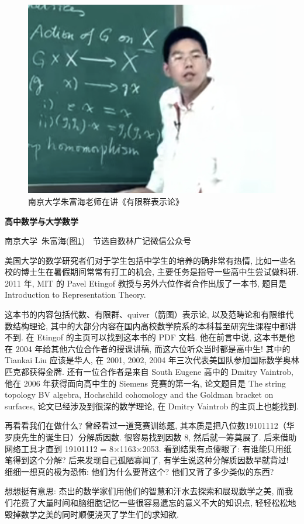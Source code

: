 	\begin{figure}
		\centering
		\includegraphics[scale=0.2]{2-prop-logic/figs/fhzhu}
		\caption{南京大学朱富海老师在讲《有限群表示论》}
		\label{fig:fhzhu}
	\end{figure}
\newpage
\begin{pas}
	\begin{center}
		\large \textbf{高中数学与大学数学}
	\end{center}
	\begin{center}
		南京大学~朱富海(图\ref{fig:fhzhu})~~节选自数林广记微信公众号
	\end{center}

	美国大学的数学研究者们对于学生包括中学生的培养的确非常有热情, 比如一些名校的博士生在暑假期间常常有打工的机会, 主要任务是指导一些高中生尝试做科研. 2011 年, MIT 的 Pavel Etingof 教授与另外六位作者合作出版了一本书, 题目是 Introduction to Representation Theory.
	

	
	这本书的内容包括代数、有限群、quiver（箭图）表示论, 以及范畴论和有限维代数结构理论, 其中的大部分内容在国内高校数学院系的本科甚至研究生课程中都讲不到. 在 Etingof 的主页可以找到这本书的 PDF 文档. 他在前言中说, 这本书是他在 2004 年给其他六位合作者的授课讲稿, 而这六位听众当时都是高中生! 其中的 Tiankai Liu 应该是华人, 在 2001, 2002, 2004 年三次代表美国队参加国际数学奥林匹克都获得金牌. 还有一位合作者是来自 South Eugene 高中的 Dmitry Vaintrob, 他在 2006 年获得面向高中生的 Siemens 竞赛的第一名, 论文题目是 The string topology BV algebra, Hochschild cohomology and the Goldman bracket on surfaces, 论文已经涉及到很深的数学理论, 在 Dmitry Vaintrob 的主页上也能找到.
	
	再看看我们在做什么? 曾经看过一道竞赛训练题, 其本质是把八位数19101112（华罗庚先生的诞生日）分解质因数. 很容易找到因数 8, 然后就一筹莫展了. 后来借助网络工具才直到 19101112 = 8×1163×2053. 看到结果有点傻眼了: 有谁能只用纸笔得到这个分解? 后来发现自己孤陋寡闻了, 有学生说这种分解质因数早就背过! 细细一想真的极为恐怖: 他们为什么要背这个? 他们又背了多少类似的东西?
	
	想想挺有意思: 杰出的数学家们用他们的智慧和汗水去探索和展现数学之美, 而我们花费了大量时间和脑细胞记忆一些很容易遗忘的意义不大的知识点, 轻轻松松地毁掉数学之美的同时顺便浇灭了学生们的求知欲.

\end{pas}
